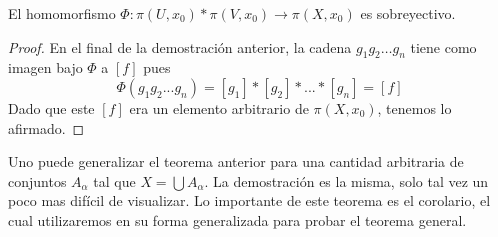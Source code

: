 \begin{corolario}\label{cor:sobre-van}
  El homomorfismo \(\Phi : \pi (U, x_0) * \pi (V, x_0) \to \pi (X,
  x_0)\) es sobreyectivo.
\end{corolario}
\begin{proof}
  En el final de la demostración anterior, la cadena \(g_1 g_2 \dots
  g_n\) tiene como imagen bajo \(\Phi\) a \([f]\) pues
  \[ \Phi \left( g_1 g_2 ... g_n \right) = [g_1] * [g_2] * ... *
    [g_n] = [f] \]
  Dado que este \([f]\) era un elemento arbitrario de \(\pi \left( X,
    x_0 \right)\), tenemos lo afirmado.
\end{proof}
Uno puede generalizar el teorema anterior para una cantidad arbitraria
de conjuntos \(A_\alpha\) tal que \(X = \bigcup A_\alpha\). La
demostración es la misma, solo tal vez un poco mas difícil de
visualizar. Lo importante de este teorema es el corolario, el cual
utilizaremos en su forma generalizada para probar el teorema general.

